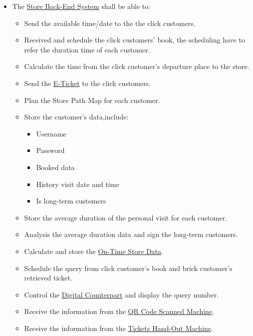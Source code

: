\documentclass[a4paper,12pt]{book}
\begin{document}
\begin{itemize}
	\item The \hyperref[Definitions]{Store Back-End System} shall be able to:
	\begin{itemize}
		\item Send the available time/date to the the click customers.
		\item Received and schedule the click customers' book, the scheduling have to refer the duration time of each customer.
		\item Calculate the time from the click customer's departure place to the store.
		\item Send the \hyperref[Definitions]{E-Ticket} to the click customers.
		\item Plan the Store Path Map for each customer.
		\item Store the customer's data,include:
		\begin{itemize}
			\item Username
			\item Password
			\item Booked data
			\item History visit date and time
			\item Is long-term customers
		\end{itemize}
		\item Store the average duration of the personal visit for each customer.
		\item Analysis the average duration data and sign the long-term customers.
		\item Calculate and store the \hyperref[Definitions]{On-Time Store Data}.
		\item Schedule the query from click customer's book and brick customer's retrieved ticket.
		\item Control the \hyperref[Definitions]{Digital Counterpart} and display the query number.
		\item Receive the information from the \hyperref[Definitions]{QR Code Scanned Machine}.
		\item Receive the information from the \hyperref[Definitions]{Tickets Hand-Out Machine}.
	\end{itemize}
\end{itemize}
\end{document}
